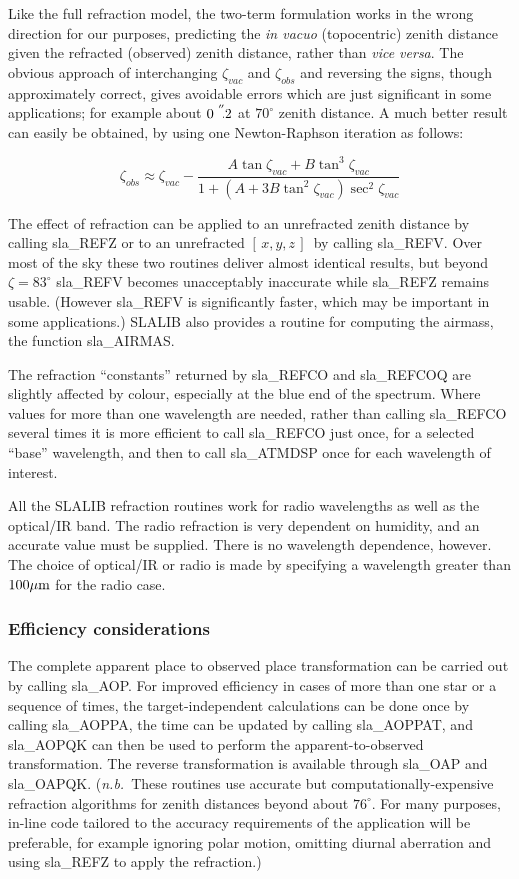 \documentclass[11pt,twoside,nolof]{starlink}
\providecommand{\xyz}       {$[\,x,y,z\,]$}
\providecommand{\arcsec}[2] {\arcseci{#1}$\hspace{-0.4em}.#2$}
\providecommand{\arcseci}[1] {$#1\hspace{-0.05em}$\raisebox{-0.5ex}
                         {$^{'\hspace{-0.1em}'}$}}
\begin{document}
Like the full refraction model, the two-term formulation works in the wrong
direction for our purposes, predicting
the \textit{in vacuo}\/ (topocentric) zenith distance
given the refracted (observed) zenith distance,
rather than \textit{vice versa}.  The obvious approach of
interchanging $\zeta _{vac}$ and $\zeta _{obs}$ and
reversing the signs, though approximately
correct, gives avoidable errors which are just significant in
some applications;  for
example about \arcsec{0}{2} at $70^\circ$ zenith distance.  A
much better result can easily be obtained, by using one Newton-Raphson
iteration as follows:

\[ \zeta _{obs} \approx \zeta _{vac}
    - \frac{A \tan \zeta _{vac} + B \tan ^{3}\zeta _{vac}}
    {1 + ( A + 3 B \tan ^{2}\zeta _{vac} ) \sec ^{2}\zeta _{vac}}\]

The effect of refraction can be applied to an unrefracted
zenith distance by calling
sla\_REFZ or to an unrefracted
\xyz\ by calling
sla\_REFV.
Over most of the sky these two routines deliver almost identical
results, but beyond $\zeta=83^\circ$
sla\_REFV
becomes unacceptably inaccurate while
sla\_REFZ
remains usable.  (However
sla\_REFV
is significantly faster, which may be important in some applications.)
SLALIB also provides a routine for computing the airmass, the function
sla\_AIRMAS.

The refraction ``constants'' returned by
sla\_REFCO and
sla\_REFCOQ
are slightly affected by colour, especially at the blue end
of the spectrum.  Where values for more than one
wavelength are needed, rather than calling
sla\_REFCO
several times it is more efficient to call
sla\_REFCO
just once, for a selected ``base'' wavelength, and then to call
sla\_ATMDSP
once for each wavelength of interest.

All the SLALIB refraction routines work for radio wavelengths as well
as the optical/IR band.  The radio refraction is very dependent on
humidity, and an accurate value must be supplied.  There is no
wavelength dependence, however.  The choice of optical/IR or
radio is made by specifying a wavelength greater than $100\mu {\rm m}$
for the radio case.

\subsubsection{Efficiency considerations}
The complete apparent place to observed place transformation
can be carried out by calling
sla\_AOP.
For improved efficiency
in cases of more than one star or a sequence of times, the
target-independent calculations can be done once by
calling
sla\_AOPPA,
the time can be updated by calling
sla\_AOPPAT,
and
sla\_AOPQK
can then be used to perform the
apparent-to-observed transformation.  The reverse transformation
is available through
sla\_OAP
and
sla\_OAPQK.
(\textit{n.b.}\ These routines use accurate but computationally-expensive
refraction algorithms for zenith distances beyond about $76^\circ$.
For many purposes, in-line code tailored to the accuracy requirements
of the application will be preferable, for example ignoring
polar motion,
omitting diurnal aberration and using
sla\_REFZ
to apply the refraction.)
\end{document}
